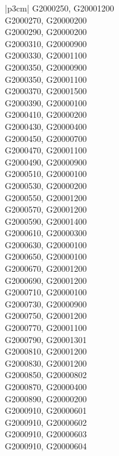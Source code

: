 \begin{customLongTable}{ |p{3cm}| }
G2000250, G20001200 \\ \hline
G2000270, G20000200 \\ \hline
G2000290, G20000200 \\ \hline
G2000310, G20000900 \\ \hline
G2000330, G20001100 \\ \hline
G2000350, G20000900 \\ \hline
G2000350, G20001100 \\ \hline
G2000370, G20001500 \\ \hline
G2000390, G20000100 \\ \hline
G2000410, G20000200 \\ \hline
G2000430, G20000400 \\ \hline
G2000450, G20000700 \\ \hline
G2000470, G20001100 \\ \hline
G2000490, G20000900 \\ \hline
G2000510, G20000100 \\ \hline
G2000530, G20000200 \\ \hline
G2000550, G20001200 \\ \hline
G2000570, G20001200 \\ \hline
G2000590, G20001400 \\ \hline
G2000610, G20000300 \\ \hline
G2000630, G20000100 \\ \hline
G2000650, G20000100 \\ \hline
G2000670, G20001200 \\ \hline
G2000690, G20001200 \\ \hline
G2000710, G20000100 \\ \hline
G2000730, G20000900 \\ \hline
G2000750, G20001200 \\ \hline
G2000770, G20001100 \\ \hline
G2000790, G20001301 \\ \hline
G2000810, G20001200 \\ \hline
G2000830, G20001200 \\ \hline
G2000850, G20000802 \\ \hline
G2000870, G20000400 \\ \hline
G2000890, G20000200 \\ \hline
G2000910, G20000601 \\ \hline
G2000910, G20000602 \\ \hline
G2000910, G20000603 \\ \hline
G2000910, G20000604 \\ \hline

\end{customLongTable}
